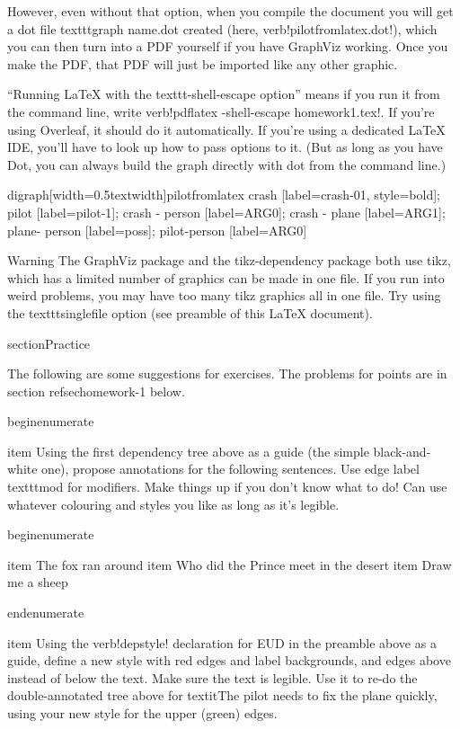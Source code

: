 However, even without that option, when you compile the document you will get a dot file texttt{graph name.dot} created (here, verb!pilotfromlatex.dot!), which you can then turn into a PDF yourself if you have GraphViz working. Once you make the PDF, that PDF will just be imported like any other graphic.

``Running LaTeX{} with the texttt{-shell-escape} option'' means if you run it from the command line, write verb!pdflatex -shell-escape homework1.tex!. If you're using Overleaf, it should do it automatically. If you're using a dedicated LaTeX{} IDE, you'll have to look up how to pass options to it. (But as long as you have Dot, you can always build the graph directly with dot from the command line.)


digraph[width=0.5textwidth]{pilotfromlatex} {
    crash [label=crash-01, style=bold];
    pilot [label=pilot-1];
    crash - person [label=ARG0];
    crash - plane [label=ARG1];
    plane- person [label=poss];
    pilot-person [label=ARG0]
    }


Warning The GraphViz package and the tikz-dependency package both use tikz, which has a limited number of graphics can be made in one file. If you run into weird problems, you may have too many tikz graphics all in one file. Try using the texttt{singlefile} option (see preamble of this LaTeX{} document).


section{Practice}

The following are some suggestions for exercises. The problems for points are in section ref{sechomework-1} below.

begin{enumerate}

item Using the first dependency tree above as a guide (the simple black-and-white one), propose annotations for the following sentences. Use edge label texttt{mod} for modifiers. Make things up if you don't know what to do! Can use whatever colouring and styles you like as long as it's legible.

begin{enumerate}

item The fox ran around
item Who did the Prince meet in the desert
item Draw me a sheep

end{enumerate}

item Using the verb!depstyle! declaration for EUD in the preamble above as a guide, define a new style with red edges and label backgrounds, and edges above instead of below the text. Make sure the text is legible. Use it to re-do the double-annotated tree above for textit{The pilot needs to fix the plane quickly}, using your new style for the upper (green) edges.

